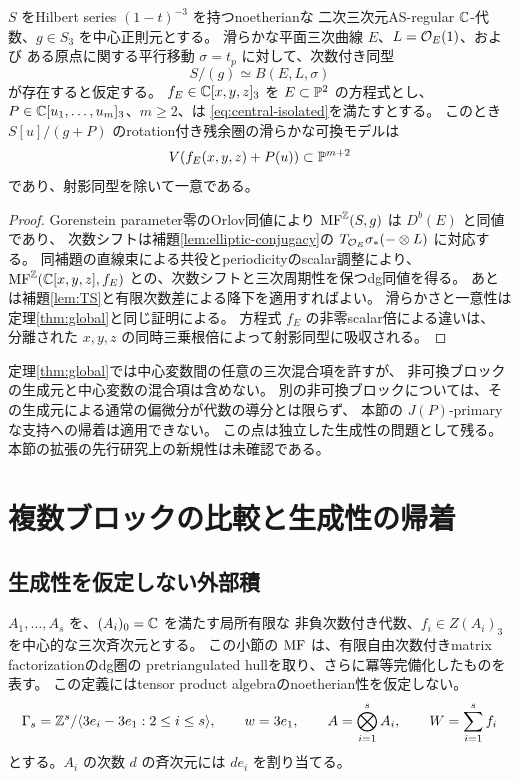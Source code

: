 \begin{corollary}[平行移動を伴う一般の楕円ブロック]\label{cor:elliptic-central-cubic}
 \(S\) をHilbert series \((1-t)^{-3}\) を持つnoetherianな
 二次三次元AS-regular \(\mathbb C\)-代数、\(g\in S_3\) を中心正則元とする。
 滑らかな平面三次曲線 \(E\)、\(L=\mathcal O_E(1)\)、および
 ある原点に関する平行移動 \(\sigma=t_p\) に対して、次数付き同型
 \[
 S/(g)\simeq B(E,L,\sigma)
 \]
 が存在すると仮定する。
 \(f_E\in\mathbb C[x,y,z]_3\) を \(E\subset\mathbb P^2\) の方程式とし、
 \(P\in\mathbb C[u_1,\ldots,u_m]_3\)、\(m\ge2\)、は
 \eqref{eq:central-isolated}を満たすとする。
 このとき \(S[u]/(g+P)\) のrotation付き残余圏の滑らかな可換モデルは
 \[
 V(f_E(x,y,z)+P(u))\subset\mathbb P^{m+2}
 \]
 であり、射影同型を除いて一意である。
\end{corollary}
\begin{proof}
 Gorenstein parameter零のOrlov同値により
 \(\operatorname{MF}^\mathbb Z(S,g)\) は \(D^b(E)\) と同値であり、
 次数シフトは補題\ref{lem:elliptic-conjugacy}の
 \(T_{\mathcal O_E}\sigma_*(-\otimes L)\) に対応する。
 同補題の直線束による共役とperiodicityのscalar調整により、
 \(\operatorname{MF}^\mathbb Z(\mathbb C[x,y,z],f_E)\) との、次数シフトと三次周期性を保つdg同値を得る。
 あとは補題\ref{lem:TS}と有限次数差による降下を適用すればよい。
 滑らかさと一意性は定理\ref{thm:global}と同じ証明による。
 方程式 \(f_E\) の非零scalar倍による違いは、
 分離された \(x,y,z\) の同時三乗根倍によって射影同型に吸収される。
\end{proof}

\begin{remark}[この拡張の範囲]
 定理\ref{thm:global}では中心変数間の任意の三次混合項を許すが、
 非可換ブロックの生成元と中心変数の混合項は含めない。
 別の非可換ブロックについては、その生成元による通常の偏微分が代数の導分とは限らず、
 本節の \(J(P)\)-primaryな支持への帰着は適用できない。
 この点は独立した生成性の問題として残る。
 本節の拡張の先行研究上の新規性は未確認である。
\end{remark}

\section{複数ブロックの比較と生成性の帰着}\label{sec:multiblock}

\subsection{生成性を仮定しない外部積}

\(A_1,\ldots,A_s\) を、\((A_i)_0=\mathbb C\) を満たす局所有限な
非負次数付き代数、\(f_i\in Z(A_i)_3\) を中心的な三次斉次元とする。
この小節の \(\operatorname{MF}\) は、有限自由次数付きmatrix factorizationのdg圏の
pretriangulated hullを取り、さらに冪等完備化したものを表す。
この定義にはtensor product algebraのnoetherian性を仮定しない。
\[
 \Gamma_s=\mathbb Z^s/\langle3e_i-3e_1:2\le i\le s\rangle,
 \qquad w=3e_1,
 \qquad A=\bigotimes_{i=1}^s A_i,
 \qquad W=\sum_{i=1}^s f_i
\]
とする。\(A_i\) の次数 \(d\) の斉次元には \(de_i\) を割り当てる。


